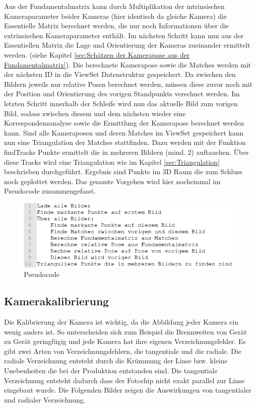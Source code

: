 Aus der Fundamentalmatrix kann durch Multiplikation der intrinsischen Kameraparameter beider Kameras (hier identisch da gleiche Kamera) die Essentielle Matrix berechnet werden, die nur noch Informationen über die extrinsischen Kameraparameter enthält. Im nächsten Schritt kann nun aus der Essentiellen Matrix die Lage und Orientierung der Kameras zueinander ermittelt werden. (siehe Kapitel \ref{sec:Schätzen der Kamerapose aus der Fundamentalmatrix}).
Die berechnete Kamerapose sowie die Matches werden mit der nächsten ID in die ViewSet  Datenstruktur gespeichert. Da zwischen den Bildern jeweils nur relative Posen berechnet werden, müssen diese zuvor noch mit der Position und Orientierung des vorigen Standpunkts verechnet werden. 
Im letzten Schritt innerhalb der Schleife wird nun das aktuelle Bild zum vorigen Bild, sodass zwischen diesem und dem nächsten wieder eine Korrespondenzanalyse sowie die Ermittlung der Kamerapose berechnet werden kann.
Sind alle Kameraposen und deren Matches im ViewSet gespeichert kann nun eine Triangulation der Matches stattfinden. Dazu werden mit der Funktion findTracks Punkte ermittelt die in mehreren Bildern (mind. 2) auftauchen. Über diese Tracks wird eine Triangulation wie im Kapitel \ref{sec:Triangulation} beschrieben durchgeführt. Ergebnis sind Punkte im 3D Raum die zum Schluss noch geplottet werden.
Das gesamte Vorgehen wird hier nocheinmal im Pseudocode zusammengefasst.
\begin{figure}[ht]
    \centering
    \includegraphics[scale=0.75]{Figures/Pseudocode.PNG}
    \caption{Pseudocode}
\end{figure}

\subsection{Kamerakalibrierung}
\label{sec:Kamerakalibrierung}
Die Kalibrierung der Kamera ist wichtig, da die Abbildung jeder Kamera ein wenig anders ist. So unterscheiden sich zum Beispiel die Brennweiten von Gerät zu Gerät geringfügig und jede Kamera hat ihre eigenen Verzeichnungsfehler.
Es gibt zwei Arten von Verzeichnungsfehlern, die tangentiale und die radiale. Die radiale Verzeichnung entsteht durch die Krümmung der Linse bzw. kleine Unebenheiten die bei der Produktion entstanden sind. Die tangentiale Verzeichnung entsteht dadurch dass der Fotochip nicht exakt parallel zur Linse eingebaut wurde. Die Folgenden Bilder zeigen die Auswirkungen von tangentialer und radialer Verzeichnung.\cite{Verlag}

